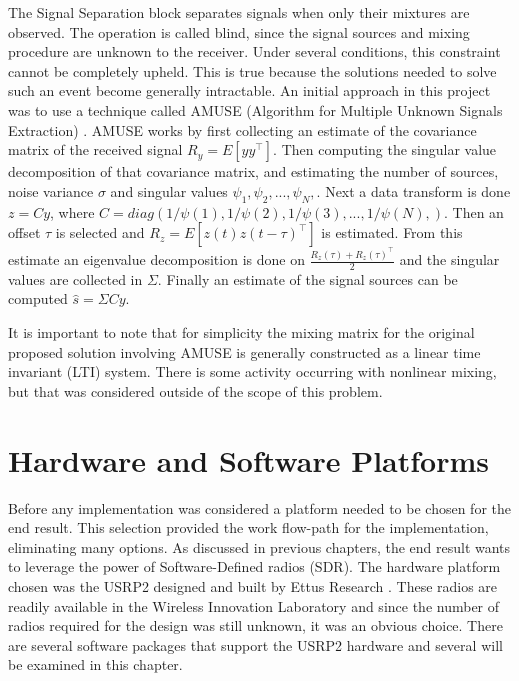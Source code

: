 The Signal Separation block separates signals when only their mixtures are observed.  The operation is called blind, since the signal sources and mixing procedure are unknown to the receiver.  Under several conditions, this constraint cannot be completely upheld.  This is true because the solutions needed to solve such an event become generally intractable.  An initial approach in this project was to use a technique called AMUSE (Algorithm for Multiple Unknown Signals Extraction) \cite{AMUSE}.  AMUSE works by first collecting an estimate of the covariance matrix of the received signal \(R_{y}=E[yy^\top]\). Then computing the singular value decomposition of that covariance matrix, and estimating the number of sources, noise variance \(\sigma\) and singular values \(\psi_{1},\psi_{2},...,\psi_{N},\).  Next a data transform is done \(z=Cy\), where \(C = diag(1/\psi(1),1/\psi(2),1/\psi(3),...,1/\psi(N),)\).  Then an offset \(\tau\) is selected and \(R_{z}=E[z(t)z(t-\tau)^\top]\) is estimated.  From this estimate an eigenvalue decomposition is done on \(\frac{R_{z}(\tau)+R_{z}(\tau)^\top}{2}\) and the singular values are collected in \(\Sigma\).  Finally an estimate of the signal sources can be computed \(\hat{s}=\Sigma C y\).  

It is important to note that for simplicity the mixing matrix for the original proposed solution involving AMUSE is generally constructed as a linear time invariant (LTI) system.  There is some activity occurring with nonlinear mixing, but that was considered outside of the scope of this problem.\\

\section{Hardware and Software Platforms}

Before any implementation was considered a platform needed to be chosen for the end result.  This selection provided the work flow-path for the implementation, eliminating many options.  As discussed in previous chapters, the end result wants to leverage the power of Software-Defined radios (SDR).  The hardware platform chosen was the USRP2 designed and built by Ettus Research \cite{USRP2Stats}.  These radios are readily available in the Wireless Innovation Laboratory and since the number of radios required for the design was still unknown, it was an obvious choice.  There are several software packages that support the USRP2 hardware and several will be examined in this chapter.\\

